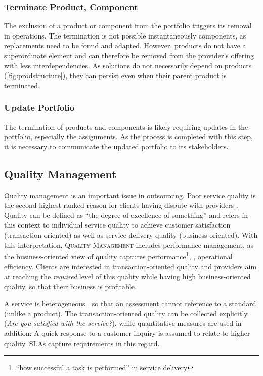 	\subsubsection{Terminate Product, Component}
	The exclusion of a product or component from the portfolio triggers its removal in operations. The termination is not  possible instantaneously \wrt components, as replacements need to be found and adapted. However, products do not have a superordinate element and can therefore be removed from the provider's offering with less interdependencies. As solutions do not necessarily depend on products (\cf \Fig \ref{fig:prodstructure}), they can persist even when their parent product is terminated. 
	
	
	\subsubsection{Update Portfolio}
	The termination of products and components is likely requiring updates in the portfolio, especially \wrt the assignments. As the process is completed with this step, it is necessary to communicate the updated portfolio to its stakeholders. 
	
	\subsection{Quality Management}
	\label{sec:qualmang}
	
	Quality management is an important issue in outsourcing. Poor service quality is the second highest ranked reason for clients having dispute with providers \citep{deloitte2014outsourcing}. Quality can be defined as \enquote{the degree of excellence of something} \citep{oxfordquality} and refers in this context to individual service quality to achieve customer satisfaction (transaction-oriented) as well as service delivery quality (business-oriented). With this interpretation, \textsc{Quality Management} includes performance management, as the business-oriented view of quality captures performance\footnote{\enquote{how successful a task is performed} \citep{oxfordperformance} in service delivery}, \ie, operational efficiency. Clients are interested in transaction-oriented quality and providers aim at reaching the \textit{required} level of this quality while having high business-oriented quality, so that their business is profitable. 
	
	A service is heterogeneous \citep{cowell1988new}, so that an assessment cannot reference to a standard (unlike a product). The transaction-oriented quality can be collected explicitly (\textit{Are you satisfied with the service?}), while quantitative measures are used in addition: A quick response to a customer inquiry is assumed to relate to higher quality. \acrshort{SLA}s capture requirements in this regard.
	
